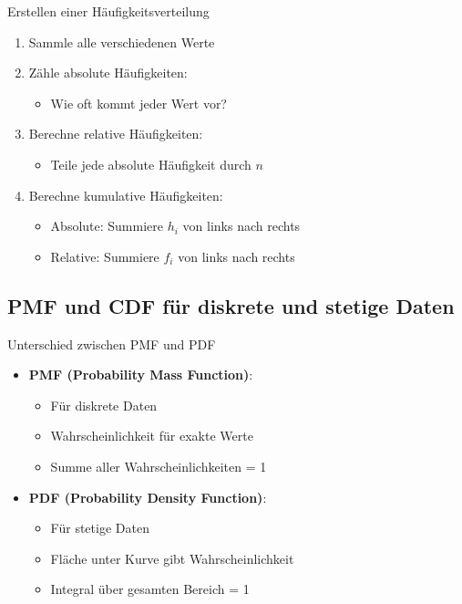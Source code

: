 \begin{KR}{Erstellen einer Häufigkeitsverteilung}
\begin{enumerate}
    \item Sammle alle verschiedenen Werte
    \item Zähle absolute Häufigkeiten:
        \begin{itemize}
            \item Wie oft kommt jeder Wert vor?
        \end{itemize}
    \item Berechne relative Häufigkeiten:
        \begin{itemize}
            \item Teile jede absolute Häufigkeit durch $n$
        \end{itemize}
    \item Berechne kumulative Häufigkeiten:
        \begin{itemize}
            \item Absolute: Summiere $h_i$ von links nach rechts
            \item Relative: Summiere $f_i$ von links nach rechts
        \end{itemize}
\end{enumerate}
\end{KR}

\subsection{PMF und CDF für diskrete und stetige Daten}

\begin{concept}{Unterschied zwischen PMF und PDF}
\begin{itemize}
    \item \textbf{PMF (Probability Mass Function)}:
        \begin{itemize}
            \item Für diskrete Daten
            \item Wahrscheinlichkeit für exakte Werte
            \item Summe aller Wahrscheinlichkeiten = 1
        \end{itemize}
    \item \textbf{PDF (Probability Density Function)}:
        \begin{itemize}
            \item Für stetige Daten
            \item Fläche unter Kurve gibt Wahrscheinlichkeit
            \item Integral über gesamten Bereich = 1
        \end{itemize}
\end{itemize}
\end{concept}

